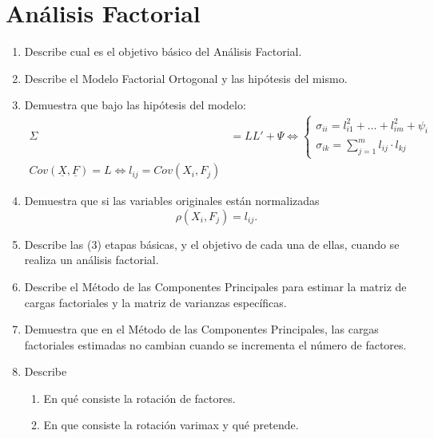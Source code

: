 \documentclass[twoside]{article}
\newcommand{\muestra}[1]{{\underline{#1}}}
\newcommand{\m}[1]{{\muestra{#1}}}
\begin{document}
\section{Análisis Factorial}
\begin{enumerate}
\item Describe cual es el objetivo básico del Análisis Factorial.
\item Describe el Modelo Factorial Ortogonal y las hipótesis del mismo.
\item Demuestra que bajo las hipótesis del modelo:
\begin{align}
\Sigma & = L L' + \Psi \Leftrightarrow
\begin{cases}
\sigma_{ii} = l_{i1}^2 + \dots + l_{im}^2 + \psi_i\\
\sigma_{ik} = \sum_{j=1}^m l_{ij} \cdot l_{kj}
\end{cases}\\
Cov(\m{X}, \m{F}) = L \Leftrightarrow l_{ij} = Cov(X_i, F_j)
\end{align}
\item Demuestra que si las variables originales están normalizadas
\[ \rho(X_i, F_j) = l_{ij}. \]
\item Describe las (3) etapas básicas, y el objetivo de cada una de ellas, cuando se realiza un análisis factorial.
\item Describe el Método de las Componentes Principales para estimar la matriz de cargas factoriales y la matriz de varianzas específicas.
\item Demuestra que en el Método de las Componentes Principales, las cargas factoriales estimadas no cambian cuando se incrementa el número de factores.
\item Describe
\begin{enumerate}
	\item En qué consiste la rotación de factores.
	\item En que consiste la rotación varimax y qué pretende.
\end{enumerate}
\end{enumerate}
\end{document}
